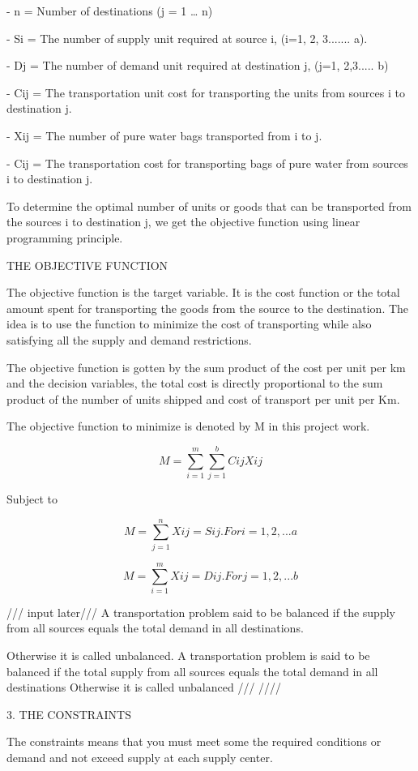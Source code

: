 \documentclass{article}
\begin{document}
- n = Number of destinations (j = 1 … n)

- Si = The number of supply unit required at source i, (i=1, 2, 3....... a).

- Dj = The number of demand unit required at destination j, (j=1, 2,3..... b)

- Cij = The transportation unit cost for transporting the units from sources i to destination j.

- Xij = The number of pure water bags transported from i to j.

- Cij = The transportation cost for transporting bags of pure water from sources i to destination j.

To determine the optimal number of units or goods that can be transported from the sources i to destination j, we get the objective function using linear programming principle.

THE OBJECTIVE FUNCTION

The objective function is the target variable. It is the cost function or the total amount spent for transporting the goods from the source to the destination. The idea is to use the function to minimize the cost of transporting while also satisfying all the supply and demand restrictions.

The objective function is gotten by the sum product of the cost per unit per km and the decision variables, the total cost is directly proportional to the sum product of the number of units shipped and cost of transport per unit per Km.

The objective function to minimize is denoted by M in this project work.

 \[M = \sum_{i=1}^{m} \sum_{j=1}^{b} Cij Xij \]
 
Subject to

 \[M = \sum_{j=1}^{n} Xij = Sij. For  i = 1, 2, ...a \]

 \[M = \sum_{i=1}^{m} Xij = Dij. For j = 1, 2, ...b\]

/// input later///
A transportation problem said to be balanced if the
supply from all sources equals the total demand in all
destinations.

Otherwise it is called unbalanced.
A transportation problem is said to be balanced
if the total supply from all sources equals the total
demand in all destinations
Otherwise it is called unbalanced
///     ////

3. THE CONSTRAINTS

The constraints means that you must meet some the required conditions or demand and not exceed supply at each supply center.
\end{document}
